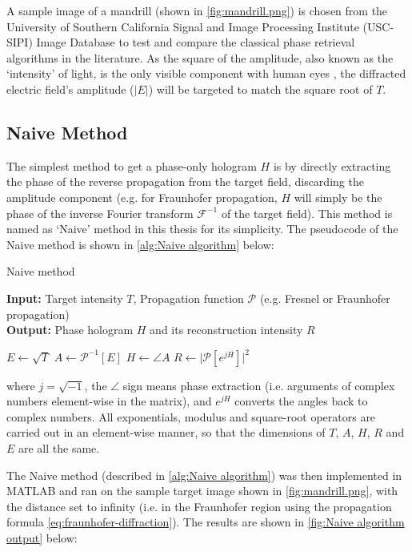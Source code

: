 A sample image of a mandrill (shown in \cref{fig:mandrill.png}) is chosen from the University of Southern California Signal and Image Processing Institute (USC-SIPI) Image Database \cite{MANDRILL_REF} to test and compare the classical phase retrieval algorithms in the literature. As the square of the amplitude, also known as the `intensity' of light, is the only visible component with human eyes \cite{Huang2024}, the diffracted electric field's amplitude ($\vert E \vert$) will be targeted to match the square root of $T$.


\subsection{Naive Method}\label{sec:Naive algorithm}
The simplest method to get a phase-only hologram $H$ is by directly extracting the phase of the reverse propagation from the target field, discarding the amplitude component (e.g. for Fraunhofer propagation, $H$ will simply be the phase of the inverse Fourier transform $\mathcal{F} ^{-1}$ of the target field). This method is named as `Naive' method in this thesis for its simplicity. The pseudocode of the Naive method is shown in \cref{alg:Naive algorithm} below:
\begin{algorithm}[H]
  \caption{Naive method}\label{alg:Naive algorithm}
  \textbf{Input:} Target intensity $T$, Propagation function $\mathcal{P}$ (e.g. Fresnel or Fraunhofer propagation)\\
  \textbf{Output:} Phase hologram $H$ and its reconstruction intensity $R$
  \begin{algorithmic}
    \State $E \gets \sqrt{T}$
    \State $A \gets \mathcal{P}^{-1}[E]$
    \State $H \gets \angle A$
    \State $R \gets \vert \mathcal{P}[e^{jH}] \vert ^2 $
  \end{algorithmic}
\end{algorithm}
where $j = \sqrt{-1} $, the $\angle$ sign means phase extraction (i.e. arguments of complex numbers element-wise in the matrix), and $e^{jH}$ converts the angles back to complex numbers. All exponentials, modulus and square-root operators are carried out in an element-wise manner, so that the dimensions of $T$, $A$, $H$, $R$ and $E$ are all the same.

The Naive method (described in \cref{alg:Naive algorithm}) was then implemented in MATLAB and ran on the sample target image shown in \cref{fig:mandrill.png}, with the distance set to infinity (i.e. in the Fraunhofer region using the propagation formula \cref{eq:fraunhofer-diffraction}). The results are shown in \cref{fig:Naive algorithm output} below:


